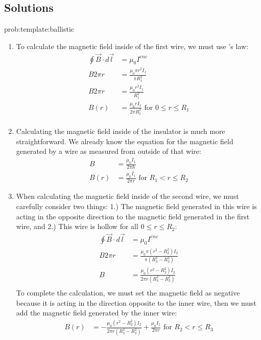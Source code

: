 \subsection{Solutions}
\begin{solution}{prob:template:ballistic}\label{soln:template:ballistic}
\begin{enumerate}[label=\alph*),topsep=-10pt]
	\item To calculate the magnetic field inside of the first wire, we must use \ampere's law:
	\begin{align*}
	\oint \vec B \cdot d\vec l &=\mu_0 I^{enc}\\
	B 2\pi r &= \frac{\mu_0 \pi r^2 I_1}{\pi R_1^2}\\
	B 2\pi r & = \frac{\mu_0 r^2 I_1}{ R_1^2}\\
	B(r) & = \frac{\mu_0 r I_1}{2\pi R_1^2} \text{ 		for } 0\leq r \leq R_1\\
	\end{align*}
	\item Calculating the magnetic field inside of the insulator is much more straightforward. We already know the equation for the magnetic field generated by a wire as measured from outside of that wire:
	\begin{align*}
	B &= \frac{\mu_0 I_1}{2\pi h}\\
	B(r) &= \frac{\mu_0 I_1}{2\pi r} \text{		for  } R_1 < r \leq R_2
	\end{align*}
	\item When calculating the magnetic field inside of the second wire, we must carefully consider two things: 1.) The magnetic field generated in this wire is acting in the opposite direction to the magnetic field generated in the first wire, and 2.) This wire is hollow for all $0\leq r \leq R_2$:
	\begin{align*}
	\oint \vec B \cdot d\vec l &= \mu_0 I^{enc}\\
	B 2\pi r & = \frac{\mu_0 \pi (r^2-R_2^2) I_2}{\pi (R_3^2-R_2^2)}\\
	B &= \frac{\mu_0 (r^2-R_2^2) I_2}{2\pi r (R_3^2-R_2^2)}\\
	\end{align*}
	To complete the calculation, we must set the magnetic field as negative because it is acting in the direction opposite to the inner wire, then we must add the magnetic field generated by the inner wire:
	\begin{align*}
	B(r) &= -\frac{\mu_0 (r^2-R_2^2) I_2}{2\pi r (R_3^2-R_2^2)} + \frac{\mu_0 I_1}{2\pi r} \text{		for  } R_2 < r \leq R_3

\end{align*}
\end{enumerate}
\end{solution}
